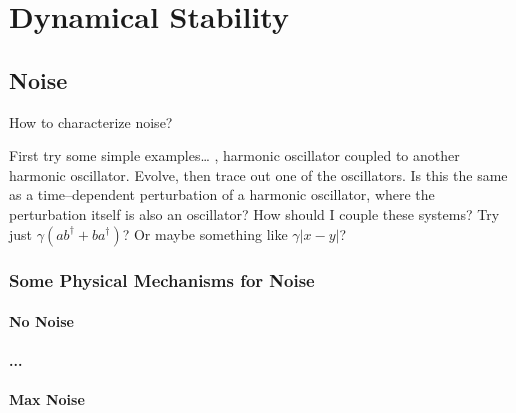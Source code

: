 
\chapter{Dynamical Stability}
\label{chap:dynamicalStability}
%




\section{Noise}

How to characterize noise?

First try some simple examples\dots
\ie, harmonic oscillator coupled to another harmonic oscillator.
Evolve, then trace out one of the oscillators.  Is this the same as
a time--dependent perturbation of a harmonic oscillator, where the
perturbation itself is also an oscillator?  How should I couple these
systems?  Try just $\gamma\left( a b^\dagger + b a^\dagger\right)$?
Or maybe something like $\gamma\left| x-y\right|$?


\subsection{Some Physical Mechanisms for Noise}

\subsubsection{No Noise}
\subsubsection{...}
\subsubsection{Max Noise}




